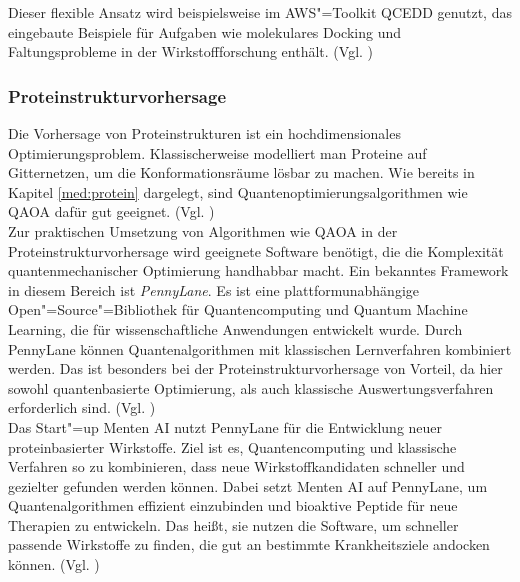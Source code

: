 Dieser flexible Ansatz wird beispielsweise im AWS"=Toolkit QCEDD genutzt, das eingebaute Beispiele für Aufgaben wie molekulares Docking und Faltungsprobleme in der Wirkstoffforschung enthält. (Vgl. \cite{amazonscience})\\ %


\subsubsection*{Proteinstrukturvorhersage}
Die Vorhersage von Proteinstrukturen ist ein hochdimensionales Optimierungsproblem. Klassischerweise modelliert man Proteine auf Gitternetzen, um die Konformationsräume lösbar zu machen. Wie bereits in Kapitel \ref{med:protein} dargelegt, sind Quantenoptimierungsalgorithmen wie QAOA dafür gut geeignet. (Vgl. \cite{boulebnane})\\

Zur praktischen Umsetzung von Algorithmen wie QAOA in der Proteinstrukturvorhersage wird geeignete Software benötigt, die die Komplexität quantenmechanischer Optimierung handhabbar macht. Ein bekanntes Framework in diesem Bereich ist \textit{PennyLane}. Es ist eine plattformunabhängige Open"=Source"=Bibliothek für Quantencomputing und Quantum Machine Learning, die für wissenschaftliche Anwendungen entwickelt wurde. Durch PennyLane können Quantenalgorithmen mit klassischen Lernverfahren kombiniert werden. Das ist besonders bei der Proteinstrukturvorhersage von Vorteil, da hier sowohl quantenbasierte Optimierung, als auch klassische Auswertungsverfahren erforderlich sind. (Vgl. \cite{PennyLane})\\

Das Start"=up Menten AI nutzt PennyLane für die Entwicklung neuer proteinbasierter Wirkstoffe. Ziel ist es, Quantencomputing und klassische Verfahren so zu kombinieren, dass neue Wirkstoffkandidaten schneller und gezielter gefunden werden können. Dabei setzt Menten AI auf PennyLane, um Quantenalgorithmen effizient einzubinden und bioaktive Peptide für neue Therapien zu entwickeln. Das heißt, sie nutzen die Software, um schneller passende Wirkstoffe zu finden, die gut an bestimmte Krankheitsziele andocken können. (Vgl. \cite{xanadu2022})\\



